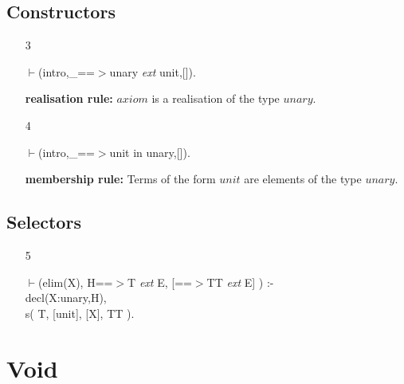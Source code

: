 \documentclass[11pt]{report}
\newcommand{\inv}[1]{\index{#1}}
\begin{document}
 \subsection{Constructors}
  
 \begin{enumerate}
 \item[3] 
\begin{sf}\begin{tabbing}
$\vdash$(intro,\_\hspace{0.1em}==$>$unary \mbox{\it ext} unit,[]).
\end{tabbing}\end{sf}

 {\bf realisation rule:} 
 $axiom$ is a realisation of the type $unary$.
  
 \item[4] 
\begin{sf}\begin{tabbing}
$\vdash$(intro,\_\hspace{0.1em}==$>$unit in unary,[]).
\end{tabbing}\end{sf}

 {\bf membership rule:} 
 Terms of the form $unit$ are elements of the type $unary$.
 \end{enumerate}
  
 \subsection{Selectors}
  
 \begin{enumerate}
 \item[5] 
\begin{sf}\begin{tabbing}
$\vdash$(elim(X), H==$>$T \mbox{\it ext} E, [==$>$TT \mbox{\it ext} E] ) :-\\[-0.15ex]
\hspace{2em}decl(X:unary,H),\\[-0.15ex]
\hspace{2em}s( T, [unit], [X], TT ).\\[-0.7ex]

\end{tabbing}\end{sf}

 \end{enumerate}
 \section{Void}
 \inv{void type}
  
\end{document}
